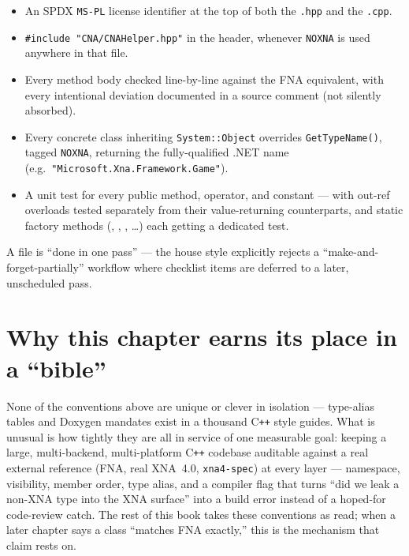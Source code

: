 \begin{itemize}
  \item An SPDX \texttt{MS-PL} license identifier at the top of both the \texttt{.hpp} and
        the \texttt{.cpp}.
  \item \texttt{\#include "CNA/CNAHelper.hpp"} in the header, whenever \texttt{NOXNA} is used
        anywhere in that file.
  \item Every method body checked line-by-line against the FNA equivalent, with every
        intentional deviation documented in a source comment (not silently absorbed).
  \item Every concrete class inheriting \texttt{System::Object} overrides
        \texttt{GetTypeName()}, tagged \texttt{NOXNA}, returning the fully-qualified .NET
        name (e.g.\ \texttt{"Microsoft.Xna.Framework.Game"}).
  \item A unit test for every public method, operator, and constant --- with out-ref
        overloads tested separately from their value-returning counterparts, and static
        factory methods (, ,
        , \ldots) each getting a dedicated test.
\end{itemize}

A file is ``done in one pass'' --- the house style explicitly rejects a
``make-and-forget-partially'' workflow where checklist items are deferred to a later,
unscheduled pass.

\section{Why this chapter earns its place in a ``bible''}

None of the conventions above are unique or clever in isolation --- type-alias tables and
Doxygen mandates exist in a thousand C\texttt{++} style guides. What is unusual is how tightly
they are all in service of one measurable goal: keeping a large, multi-backend,
multi-platform C\texttt{++} codebase auditable against a real external reference (FNA, real
XNA~4.0, \texttt{xna4-spec}) at every layer --- namespace, visibility, member order, type
alias, and a compiler flag that turns ``did we leak a non-XNA type into the XNA surface''
into a build error instead of a hoped-for code-review catch. The rest of this book takes
these conventions as read; when a later chapter says a class ``matches FNA exactly,'' this is
the mechanism that claim rests on.
